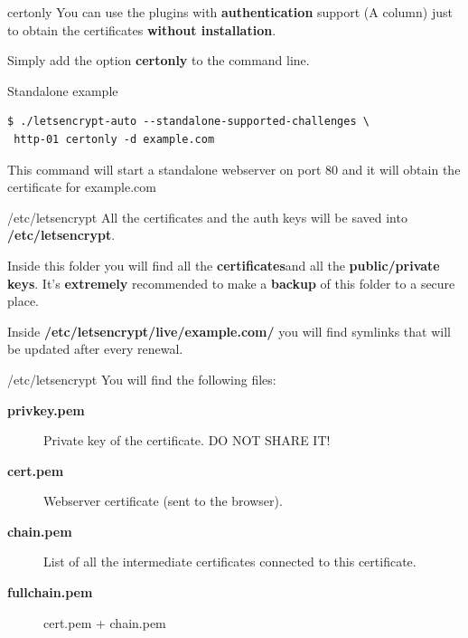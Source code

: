 \documentclass[xcolor=svgnames,11pt]{beamer}
\begin{document}
\begin{frame}[fragile]{certonly}
You can use the plugins with \textbf{authentication} support (A column) just to obtain the certificates \textbf{without installation}.

\medskip\pause

Simply add the option \textbf{certonly} to the command line.

\medskip

\begin{block}{Standalone example}

\begin{scriptsize}
\begin{verbatim}
$ ./letsencrypt-auto --standalone-supported-challenges \
 http-01 certonly -d example.com
\end{verbatim}
\end{scriptsize}

This command will start a standalone webserver on port 80 and it will obtain the certificate for example.com
\end{block}
\end{frame}

\begin{frame}{/etc/letsencrypt}
All the certificates and the auth keys will be saved into
\textbf{/etc/letsencrypt}.

\medskip\pause
{
\begin{block}{}
Inside this folder you will find all the \textbf{certificates}and all the \textbf{public/private keys}.
It's \textbf{extremely} recommended to make a \textbf{backup} of this folder to a secure place.
\end{block}
}
\medskip\pause
Inside \textbf{/etc/letsencrypt/live/example.com/} you will find symlinks that will be updated after every renewal.
\end{frame}

\begin{frame}{/etc/letsencrypt}
You will find the following files:
\begin{description}
  \item[\textbf{\small privkey.pem}] Private key of the certificate. DO NOT SHARE IT!
  \item[\textbf{\small cert.pem}] Webserver certificate (sent to the browser).
  \item[\textbf{\small chain.pem}] List of all the intermediate certificates connected to this certificate.
  \item[\textbf{\small fullchain.pem}] cert.pem + chain.pem
\end{description}
\end{frame}
\end{document}
